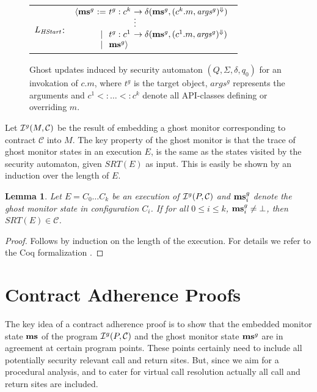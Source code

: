 \documentclass[10pt,twocolumn]{article}
\newtheorem{lemma}{Lemma}
\newcommand{\ghost}[1]{{\it #1}^g}
\newcommand{\MS}{{\bf ms}}
\newcommand{\SRT}{\mathit{SRT}}
\newcommand{\Contract}{\mathcal{C}}
\newcommand{\Inline}{{\cal I}}
\newcommand{\GI}{\ghost{\Inline}}
\begin{document}
\begin{figure}
\begin{tabular}{@{}r@{~}l@{}}
 $L_{\it HStart}$:&$\begin{array}[t]{@{}l@{~}c@{~}l@{~}l}
         \langle \MS^g &:=& t^g : c^k & \rightarrow \delta(\MS^g, (c^k.m, \mathit{args}^g)^\Downarrow) \\[-1.5mm]
                       &  &           & \vdots                                   \\
                       &| & t^g : c^1 & \rightarrow \delta(\MS^g, (c^1.m, \mathit{args}^g)^\Downarrow) \\
                       &| & \MS^g \rangle &
         \end{array}$
\end{tabular}
\caption{\label{fig:ghost_embedding} Ghost updates induced by security automaton $(Q, \Sigma, \delta, q_0)$ for an invokation of $c.m$, where $t^g$ is the target object, $\mathit{args}^g$ represents the arguments and $c^1 <: \ldots <: c^k$ denote all API-classes defining or overriding $m$.}
\end{figure}

Let $\GI(M, \Contract)$ be the result of embedding a ghost monitor
corresponding to contract $\Contract$ into $M$.
The key property of the ghost monitor is that the trace of ghost monitor 
states in an execution $E$, is the same as
the states visited by the security  automaton, given $\SRT(E)$ as input. 
This is easily be shown by an induction over the length of $E$.
\begin{lemma}\label{lem:ghost_mon_correct}
Let $E = C_0\ldots C_k$ be an execution of ${\cal I}^g(P, \Contract)$ 
and $\MS^g_i$ denote the ghost monitor state in 
configuration $C_i$. If for all $0 \leq i \leq k$, $\MS^g_i \neq \bot$, 
then $\SRT(E) \in \Contract$.
\end{lemma}
\begin{proof}
Follows by induction on the length of the execution. For details we refer to the Coq formalization \cite{coqscript}.
\end{proof}


\section{Contract Adherence Proofs}
The key idea of a contract adherence proof is to show that the embedded 
monitor state $\MS$ of the program
${\cal I}^g(P, \Contract)$ and the ghost monitor state $\MS^g$ 
are in agreement at certain program points. 
These points certainly need to 
include all potentially security relevant call and return
sites. But, since we aim for a procedural analysis, and to cater for
virtual call resolution actually all call 
and return sites are included. 
\end{document}
